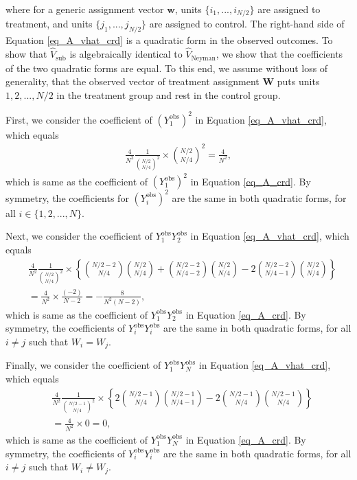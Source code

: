 \documentclass[12pt]{article}
\begin{document}
where for a generic assignment vector $\bm{w}$, units $\{i_1,...,i_{N/2}\}$ are assigned to treatment, and units $\{j_1,...,j_{N/2}\}$ are assigned to control.
The right-hand side of Equation \ref{eq_A_vhat_crd} is a quadratic form in the observed outcomes. To show that $\hat{V}_{\text{sub}}$ is algebraically identical to $\hat{V}_{\text{Neyman}}$, we show that the coefficients of the two quadratic forms are equal. To this end, we assume without loss of generality, that the observed vector of treatment assignment $\bm{W}$ puts units $1,2,...,N/2$ in the treatment group and rest in the control group. 

First, we consider the coefficient of $(Y^{\text{obs}}_1)^2$ in Equation \ref{eq_A_vhat_crd}, which equals 
\begin{align}
 \frac{4}{N^2} \frac{1}{\binom{N/2}{N/4}^2} \times {\binom{N/2}{N/4}^2}   = \frac{4}{N^2},
\end{align}
which is same as the coefficient of $(Y^\text{obs}_1)^2$ in Equation \ref{eq_A_crd}. By symmetry, the coefficients for $(Y^\text{obs}_i)^2$ are the same in both quadratic forms, for all $i \in \{1,2,...,N\}$.

Next, we consider the coefficient of $Y^{\text{obs}}_1 Y^{\text{obs}}_2$ in Equation \ref{eq_A_vhat_crd}, which equals
\begin{align}
&    \frac{4}{N^2}\frac{1}{\binom{N/2}{N/4}^2} \times\left\{\binom{N/2 - 2}{N/4}\binom{N/2}{N/4} + \binom{N/2 - 2}{N/4 - 2}\binom{N/2}{N/4} - 2\binom{N/2 - 2}{N/4 - 1}\binom{N/2}{N/4} \right\} \nonumber \\
& = \frac{4}{N^2} \times \frac{(-2)}{N-2} = -\frac{8}{N^2(N-2)},
\end{align}
which is same as the coefficient of $Y^{\text{obs}}_1 Y^{\text{obs}}_2$ in Equation \ref{eq_A_crd}. By symmetry, the coefficients of $Y^{\text{obs}}_i Y^{\text{obs}}_i$ are the same in both quadratic forms, for all $i \neq j$ such that $W_i = W_j$. 

Finally, we consider the coefficient of $Y^{\text{obs}}_1 Y^{\text{obs}}_{N}$ in Equation \ref{eq_A_vhat_crd}, which equals
\begin{align}
&    \frac{4}{N^2}\frac{1}{\binom{N/2-1}{N/4}^2} \times\left\{2\binom{N/2 - 1}{N/4}\binom{N/2-1}{N/4-1} - 2\binom{N/2 - 1}{N/4}\binom{N/2-1}{N/4} \right\} \nonumber \\
& = \frac{4}{N^2} \times 0 = 0,
\end{align}
which is same as the coefficient of $Y^{\text{obs}}_1 Y^{\text{obs}}_N$ in Equation \ref{eq_A_crd}. By symmetry, the coefficients of $Y^{\text{obs}}_i Y^{\text{obs}}_i$ are the same in both quadratic forms, for all $i \neq j$ such that $W_i \neq W_j$. 
\end{document}
